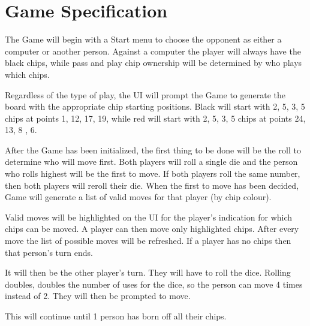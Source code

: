 \newpage

\appendix

\chapter{Game Specification}

The Game will begin with a Start menu to choose the opponent as either a computer or another person.
Against a computer the player will always have the black chips, while pass and play chip ownership will be determined by who plays which chips.

Regardless of the type of play, the UI will prompt the Game to
generate the board with the appropriate chip starting positions.
Black will start with 2, 5, 3, 5 chips at points 1, 12, 17, 19,
while red will start with 2, 5, 3, 5 chips at points 24, 13, 8 , 6.

After the Game has been initialized, the first thing to be done will
be the roll to determine who will move first. Both players will roll a
single die and the person who rolls highest will be the first to move.
If both players roll the same number, then both players will reroll their die.
When the first to move has been decided, Game will generate a list of valid
moves for that player (by chip colour).

Valid moves will be highlighted on the UI for the player's indication for
which chips can be moved. A player can then move only highlighted chips.
After every move the list of possible moves will be refreshed.
If a player has no chips then that person's turn ends.

It will then be the other player's turn. They will have to roll the dice.
Rolling doubles, doubles the number of uses for the dice, so the person can
move 4 times instead of 2. They will then be prompted to move.

This will continue until 1 person has born off all their chips.
